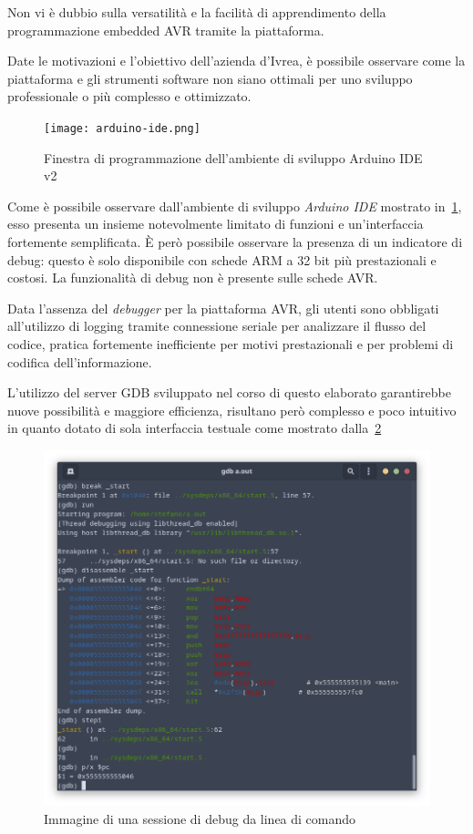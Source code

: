 Non vi è dubbio sulla versatilità e la facilità di apprendimento della programmazione embedded AVR tramite la piattaforma.

Date le motivazioni e l'obiettivo dell'azienda d'Ivrea, è possibile osservare come la piattaforma e gli strumenti software non siano ottimali per uno sviluppo professionale o più complesso e ottimizzato.

\begin{figure}
    \centering
    \texttt{[image: arduino-ide.png]}
    \caption[Immagine del software Arduino IDE v2]{Finestra di programmazione dell'ambiente di sviluppo Arduino IDE v2}\label{fig:arduino-ide}
\end{figure}

Come è possibile osservare dall'ambiente di sviluppo \textit{Arduino IDE} mostrato in~\cref{fig:arduino-ide}, esso presenta un insieme notevolmente limitato di funzioni e un'interfaccia fortemente semplificata. È però possibile osservare la presenza di un indicatore di debug: questo è solo disponibile con schede ARM a 32 bit più prestazionali e costosi. La funzionalità di debug non è presente sulle schede AVR.\@

Data l'assenza del \textit{debugger} per la piattaforma AVR, gli utenti sono obbligati all'utilizzo di logging tramite connessione seriale per analizzare il flusso del codice, pratica fortemente inefficiente per motivi prestazionali e per problemi di codifica dell'informazione.

L'utilizzo del server GDB sviluppato nel corso di questo elaborato garantirebbe nuove possibilità e maggiore efficienza, risultano però complesso e poco intuitivo in quanto dotato di sola interfaccia testuale come mostrato dalla~\cref{fig:gdb-cli}

\begin{figure}
    \centering
    \includegraphics[width=.7\textwidth]{gdb-cli.png}
    \caption[]{Immagine di una sessione di debug da linea di comando}\label{fig:gdb-cli}
\end{figure}

